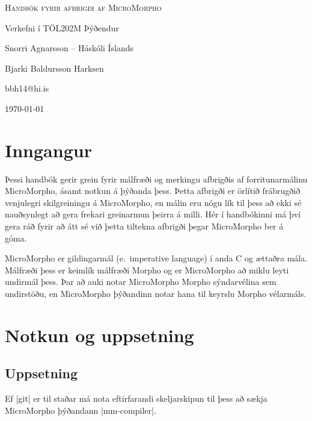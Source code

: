 \documentclass[12pt]{article}
\begin{document}
\shortverb{\|}

\begin{titlepage}
    \centering
    \vspace*{4cm}
    {\huge\scshape Handbók fyrir afbrigði af MicroMorpho}\par
    \vspace{0.5cm}
    {\Large Verkefni í TÖL202M Þýðendur}\par
    {\large Snorri Agnarsson – Háskóli Íslands}\par
    \vspace{5cm}
    {\large Bjarki Baldursson Harksen\par}
    \vspace{0.2cm}
    {\large\ttfamily bbh14@hi.is}\par
    \vfill
    \today
\end{titlepage}


\tableofcontents


\section{Inngangur}
Þessi handbók gerir grein fyrir málfræði og merkingu
afbrigðis af forritunarmálinu MicroMorpho, ásamt notkun
á þýðanda þess.
Þetta afbrigði er örlítið frábrugðið venjulegri skilgreiningu
á MicroMorpho, en málin eru nógu lík til þess að ekki sé nauðsynlegt
að gera frekari greinarmun þeirra á milli.
Hér í handbókinni má því gera ráð fyrir að átt sé við þetta
tiltekna afbrigði þegar MicroMorpho ber á góma.

MicroMorpho er gildingarmál (e.~imperative language) í anda C og ættaðra mála.
Málfræði þess er keimlík málfræði Morpho og er MicroMorpho að miklu leyti undirmál þess.
Þar að auki notar MicroMorpho Morpho sýndarvélina sem undirstöðu, en
MicroMorpho þýðandinn notar hana til keyrslu Morpho vélarmáls.

\section{Notkun og uppsetning}

\subsection{Uppsetning}
Ef |git| er til staðar má nota eftirfarandi skeljarskipun
til þess að sækja MicroMorpho þýðandann |mm-compiler|.
\end{document}
